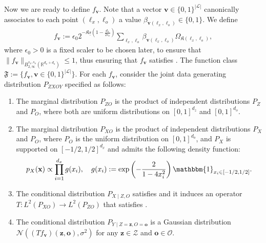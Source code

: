 \documentclass[11pt]{article}
\newcommand{\one}{\mathbbm{1}}
\newcommand{\bx}{\mathbf x}
\newcommand{\bz}{\mathbf z}
\newcommand{\bv}{\mathbf v}
\newcommand{\bo}{\mathbf o}
\newcommand{\calZ}{\mathcal{Z}}
\newcommand{\calN}{\mathcal{N}}
\newcommand{\calO}{\mathcal{O}}
\newcommand{\calL}{\mathcal{L}}
\newcommand{\bl}{{\boldsymbol\ell}}
\newcommand{\0}{\mathbf{0}}
\newcommand{\steve}[1]{#1}
\begin{document}
\begin{appendix}
\begin{align}
\end{align}
Now we are ready to define $f_{\bv}$. Note that a vector $\bv \in \{0,1\}^{|\calL|}$ canonically associates to each point $(\bl_x,\bl_o)$ a value $\beta_{\bv(\bl_x,\bl_o)}\in \{0,1\}$. We define 
\begin{align}
\label{eq: defn_fv}
    f_{\bv} := \epsilon_0 2^{-\mathfrak{K}\underline{s}\left(1 - \frac{d_x}{2s_x}\right)} \sum_{\bl_x,\bl_o}\beta_{\bv(\bl_x,\bl_o)}\Omega_{\mathfrak{K}(\bl_x,\bl_o)},
\end{align}
\steve{where $\epsilon_0 > 0$ is a fixed scaler to be chosen later, to ensure that $\|f_{\bv}\|_{B^{s_x,s_o}_{2,\infty}(\mathbb{R}^{d_x+d_o})}\leq 1$, thus ensuring that $f_{\bv}$ satisfies \Cref{ass:f_ast}.} The function class $\mathfrak{F}:=\{ f_{\bv},  \bv \in \{0,1\}^{|\calL|}\}$. 
For each $f_{\bv}$, consider the joint data generating distribution $P_{ZXOY}$ specified as follows: 
\begin{enumerate}
    \item The marginal distribution $P_{ZO}$ is the product of independent distributions $P_{Z}$ and $P_{O}$, where both are uniform distributions on $[0,1]^{d_z}$ and $[0,1]^{d_o}$.
    \item The marginal distribution $P_{XO}$ is the product of independent distributions $P_{X}$ and $P_{O}$, where $P_{O}$ is the uniform distribution on $[0,1]^{d_o}$, and $P_X$ is supported on $[-1/2,1/2]^{d_x}$ and admits the following density function:
    \begin{align}\label{eq:p_X_bump}
        p_X(\bx)\propto \prod_{i=1}^{d_x} g(x_i), \quad g(x_i) := \exp\left(-\frac{2}{1 - 4x_i^2}\right) \one_{x_i \in [-1/2, 1/2]} .
    \end{align}
    \item The conditional distribution $P_{X\mid Z, O}$ satisfies  and it induces an operator $T: L^2\left(P_{XO}\right) \rightarrow L^2\left(P_{ZO}\right)$ that satisfies . 
    \item The conditional distribution $P_{Y\mid Z=\bz, O=\bo}$ is a Gaussian distribution $\calN((Tf_{\bv})(\bz,\bo),\sigma^2)$ for any $\bz\in\calZ$ and $\bo\in\calO$. 
\end{enumerate}


\end{appendix}
\end{document}
